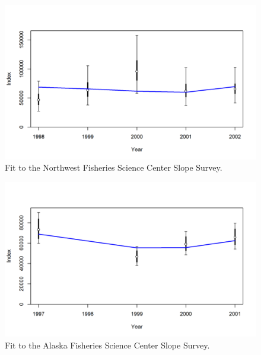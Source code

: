 \documentclass[11pt,
  english,
  a4paper,
]{article}
\begin{document}
\begin{figure}
\centering
\includegraphics[width=1\textwidth,height=1\textheight]{figs/index2_cpuefit_NWSLP.png}
\caption{Fit to the Northwest Fisheries Science Center Slope Survey.\label{fig:ind_NWFSCslope}}
\end{figure}

\tagmcend\tagstructend


\begin{figure}
\centering
\includegraphics[width=1\textwidth,height=1\textheight]{figs/index2_cpuefit_AKSLP.png}
\caption{Fit to the Alaska Fisheries Science Center Slope Survey.\label{fig:ind_AFSCslope}}
\end{figure}

\tagmcend\tagstructend

\end{document}
